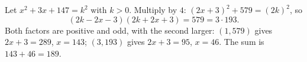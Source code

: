 Let $x^2+3x+147=k^2$ with $k>0$. Multiply by $4$: $(2x+3)^2+579=(2k)^2$, so
\[(2k-2x-3)(2k+2x+3)=579=3\cdot193.\]
Both factors are positive and odd, with the second larger: $(1,579)$ gives $2x+3=289$, $x=143$; $(3,193)$ gives $2x+3=95$, $x=46$. The sum is $143+46=\boxed{189}$.
